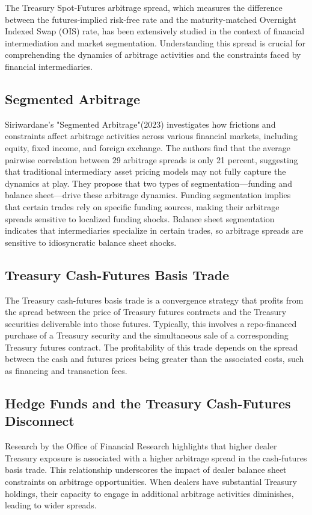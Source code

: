 \documentclass{article}
\begin{document}
The Treasury Spot-Futures arbitrage spread, which measures the difference between the futures-implied risk-free rate and the maturity-matched Overnight Indexed Swap (OIS) rate, has been extensively studied in the context of financial intermediation and market segmentation. Understanding this spread is crucial for comprehending the dynamics of arbitrage activities and the constraints faced by financial intermediaries.​

\subsection{Segmented Arbitrage}
Siriwardane's "Segmented Arbitrage"(2023) investigates how frictions and constraints affect arbitrage activities across various financial markets, including equity, fixed income, and foreign exchange. The authors find that the average pairwise correlation between 29 arbitrage spreads is only 21 percent, suggesting that traditional intermediary asset pricing models may not fully capture the dynamics at play. They propose that two types of segmentation—funding and balance sheet—drive these arbitrage dynamics. Funding segmentation implies that certain trades rely on specific funding sources, making their arbitrage spreads sensitive to localized funding shocks. Balance sheet segmentation indicates that intermediaries specialize in certain trades, so arbitrage spreads are sensitive to idiosyncratic balance sheet shocks. ​
\subsection{Treasury Cash-Futures Basis Trade}
The Treasury cash-futures basis trade is a convergence strategy that profits from the spread between the price of Treasury futures contracts and the Treasury securities deliverable into those futures. Typically, this involves a repo-financed purchase of a Treasury security and the simultaneous sale of a corresponding Treasury futures contract. The profitability of this trade depends on the spread between the cash and futures prices being greater than the associated costs, such as financing and transaction fees. ​
\subsection{Hedge Funds and the Treasury Cash-Futures Disconnect}
Research by the Office of Financial Research highlights that higher dealer Treasury exposure is associated with a higher arbitrage spread in the cash-futures basis trade. This relationship underscores the impact of dealer balance sheet constraints on arbitrage opportunities. When dealers have substantial Treasury holdings, their capacity to engage in additional arbitrage activities diminishes, leading to wider spreads. ​
\end{document}
